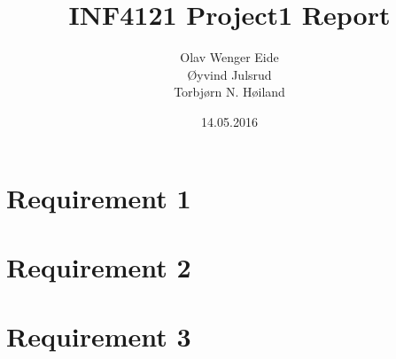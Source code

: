 \documentclass[11pt]{report}
\title{INF4121 Project1 Report}
\author{
	{Olav Wenger Eide}\\
	{Øyvind Julsrud}\\
	{Torbjørn N. Høiland}
	}
\date{14.05.2016}
\begin{document}
\maketitle

\section*{Requirement 1}


\section*{Requirement 2}


\section*{Requirement 3}

\end{document}
